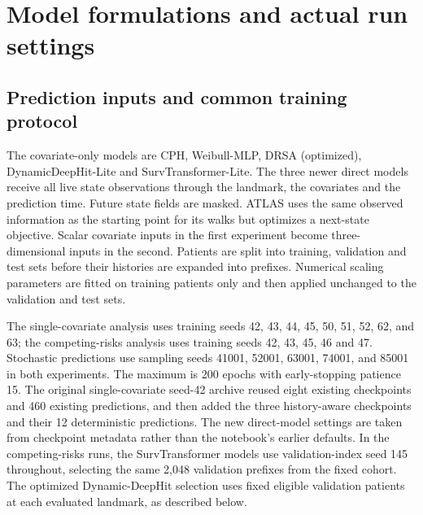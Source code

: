 \section{Model formulations and actual run settings}\label{app:models}
\subsection{Prediction inputs and common training protocol}
The covariate-only models are CPH, Weibull-MLP, DRSA (optimized), DynamicDeepHit-Lite and SurvTransformer-Lite. The three newer direct models receive all live state observations through the landmark, the covariates and the prediction time. Future state fields are masked. ATLAS uses the same observed information as the starting point for its walks but optimizes a next-state objective. Scalar covariate inputs in the first experiment become three-dimensional inputs in the second. Patients are split into training, validation and test sets before their histories are expanded into prefixes. Numerical scaling parameters are fitted on training patients only and then applied unchanged to the validation and test sets.

The single-covariate analysis uses training seeds 42, 43, 44, 45, 50, 51, 52, 62, and 63; the competing-risks analysis uses training seeds 42, 43, 45, 46 and 47. Stochastic predictions use sampling seeds 41001, 52001, 63001, 74001, and 85001 in both experiments. The maximum is 200 epochs with early-stopping patience 15. The original single-covariate seed-42 archive reused eight existing checkpoints and 460 existing predictions, and then added the three history-aware checkpoints and their 12 deterministic predictions. The new direct-model settings are taken from checkpoint metadata rather than the notebook's earlier defaults. In the competing-risks runs, the SurvTransformer models use validation-index seed 145 throughout, selecting the same 2,048 validation prefixes from the fixed cohort. The optimized Dynamic-DeepHit selection uses fixed eligible validation patients at each evaluated landmark, as described below.

